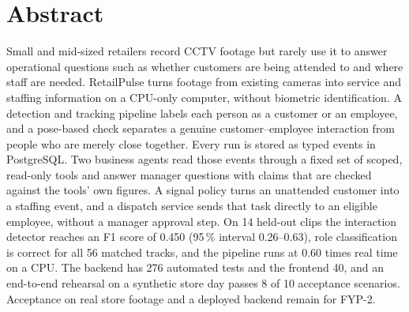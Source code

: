 \chapter*{Abstract}
Small and mid-sized retailers record CCTV footage but rarely use it to answer operational questions such as whether customers are being attended to and where staff are needed. RetailPulse turns footage from existing cameras into service and staffing information on a CPU-only computer, without biometric identification. A detection and tracking pipeline labels each person as a customer or an employee, and a pose-based check separates a genuine customer--employee interaction from people who are merely close together. Every run is stored as typed events in PostgreSQL. Two business agents read those events through a fixed set of scoped, read-only tools and answer manager questions with claims that are checked against the tools' own figures. A signal policy turns an unattended customer into a staffing event, and a dispatch service sends that task directly to an eligible employee, without a manager approval step. On 14 held-out clips the interaction detector reaches an F1 score of 0.450 (95\,\% interval 0.26--0.63), role classification is correct for all 56 matched tracks, and the pipeline runs at 0.60 times real time on a CPU. The backend has 276 automated tests and the frontend 40, and an end-to-end rehearsal on a synthetic store day passes 8 of 10 acceptance scenarios. Acceptance on real store footage and a deployed backend remain for FYP-2.
